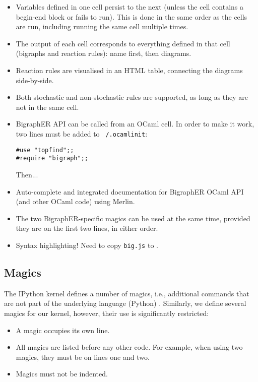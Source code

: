 \documentclass{article}
\begin{document}
\begin{itemize}
\item Variables defined in one cell persist to the next (unless the cell
  contains a begin-end block or fails to run). This is done in the same order as
  the cells are run, including running the same cell multiple times.
\item The output of each cell corresponds to everything defined in that cell
  (bigraphs and reaction rules): name first, then diagrams.
\item Reaction rules are visualised in an HTML table, connecting the diagrams
  side-by-side.
\item Both stochastic and non-stochastic rules are supported, as long as they
  are not in the same cell.
\item BigraphER API can be called from an OCaml cell. In order to make it work,
  two lines must be added to \texttt{~/.ocamlinit}:
  \begin{lstlisting}
#use "topfind";;
#require "bigraph";;
  \end{lstlisting}
  Then... %
\item Auto-complete and integrated documentation for BigraphER OCaml API (and
  other OCaml code) using Merlin.
\item The two BigraphER-specific magics can be used at the same time, provided
  they are on the first two lines, in either order.
\item Syntax highlighting! Need to copy \texttt{big.js} to
  .
\end{itemize}

\subsection{Magics}

The IPython kernel defines a number of magics, i.e., additional commands that
are not part of the underlying language (Python) \cite{website:magic}.
Similarly, we define several magics for our kernel, however, their use is
significantly restricted:
\begin{itemize}
\item A magic occupies its own line.
\item All magics are listed before any other code. For example, when using two
  magics, they must be on lines one and two.
\item Magics must not be indented.
\end{itemize}
\end{document}
